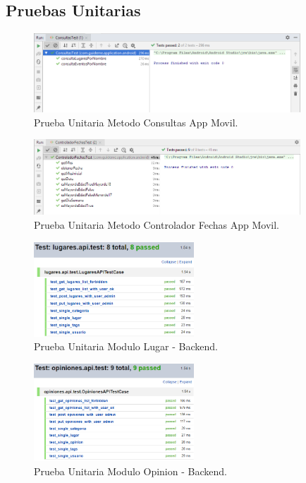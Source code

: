 \documentclass[12pt,letterpaper,openany]{book}
\begin{document}
\subsection{Pruebas Unitarias}
\begin{figure}[H]
\begin{center}
\includegraphics[width=10cm]{./imagenes/Test/ConsultasTest}
\caption{Prueba Unitaria Metodo Consultas App Movil.}
\end{center}
\end{figure}

\begin{figure}[H]
\begin{center}
\includegraphics[width=10cm]{./imagenes/Test/ControladorFechasTest}
\caption{Prueba Unitaria Metodo Controlador Fechas App Movil.}
\end{center}
\end{figure}

\begin{figure}[H]
\begin{center}
\includegraphics[width=6cm]{./imagenes/Test/Backend/Test__lugares_api_test}
\caption{Prueba Unitaria Modulo Lugar - Backend.}
\end{center}
\end{figure}

\begin{figure}[H]
\begin{center}
\includegraphics[width=6cm]{./imagenes/Test/Backend/Test__opiniones_api_test}
\caption{Prueba Unitaria Modulo Opinion - Backend.}
\end{center}
\end{figure}
\end{document}
